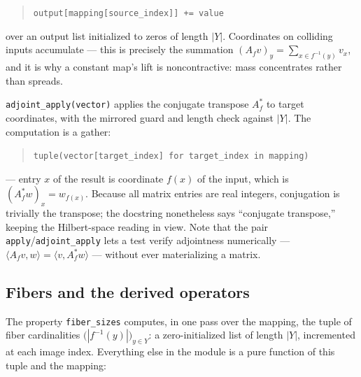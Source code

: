 \begin{quote}
\texttt{output[mapping[source\_index]] += value}
\end{quote}

over an output list initialized to zeros of length $|Y|$. Coordinates on
colliding inputs accumulate --- this is precisely the summation
$ (A_f v)_y = \sum_{x \in f^{-1}(y)} v_x$, and it is why a constant map's
lift is noncontractive: mass concentrates rather than spreads.

\texttt{adjoint\_apply(vector)} applies the conjugate transpose $A_f^{*}$
to target coordinates, with the mirrored guard and length check against
$|Y|$. The computation is a gather:

\begin{quote}
\texttt{tuple(vector[target\_index] for target\_index in mapping)}
\end{quote}

--- entry $x$ of the result is coordinate $f(x)$ of the input, which is
$(A_f^* w)_x = w_{f(x)}$. Because all matrix entries are real integers,
conjugation is trivially the transpose; the docstring nonetheless says
``conjugate transpose,'' keeping the Hilbert-space reading in view. Note
that the pair \texttt{apply}/\texttt{adjoint\_apply} lets a test verify
adjointness numerically --- $\langle A_f v, w\rangle = \langle v, A_f^* w
\rangle$ --- without ever materializing a matrix.

\subsection{Fibers and the derived operators}

The property \texttt{fiber\_sizes} computes, in one pass over the mapping,
the tuple of fiber cardinalities $\bigl(|f^{-1}(y)|\bigr)_{y \in Y}$: a
zero-initialized list of length $|Y|$, incremented at each image index.
Everything else in the module is a pure function of this tuple and the
mapping:

